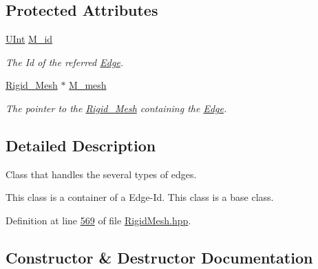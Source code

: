 \subsection*{Protected Attributes}
\begin{DoxyCompactItemize}
\item 
\hyperlink{namespaceFVCode3D_a4bf7e328c75d0fd504050d040ebe9eda}{U\+Int} \hyperlink{classFVCode3D_1_1Rigid__Mesh_1_1Edge__ID_ad2b90debdaec4de3ba2258ed1ab04f6e}{M\+\_\+id}
\begin{DoxyCompactList}\small\item\em The Id of the referred \hyperlink{classFVCode3D_1_1Rigid__Mesh_1_1Edge}{Edge}. \end{DoxyCompactList}\item 
\hyperlink{classFVCode3D_1_1Rigid__Mesh}{Rigid\+\_\+\+Mesh} $\ast$ \hyperlink{classFVCode3D_1_1Rigid__Mesh_1_1Edge__ID_ae24b58fc7aaf0faa1164935de641d753}{M\+\_\+mesh}
\begin{DoxyCompactList}\small\item\em The pointer to the \hyperlink{classFVCode3D_1_1Rigid__Mesh}{Rigid\+\_\+\+Mesh} containing the \hyperlink{classFVCode3D_1_1Rigid__Mesh_1_1Edge}{Edge}. \end{DoxyCompactList}\end{DoxyCompactItemize}


\subsection{Detailed Description}
Class that handles the several types of edges. 

This class is a container of a Edge-\/\+Id. This class is a base class. 

Definition at line \hyperlink{RigidMesh_8hpp_source_l00569}{569} of file \hyperlink{RigidMesh_8hpp_source}{Rigid\+Mesh.\+hpp}.



\subsection{Constructor \& Destructor Documentation}
